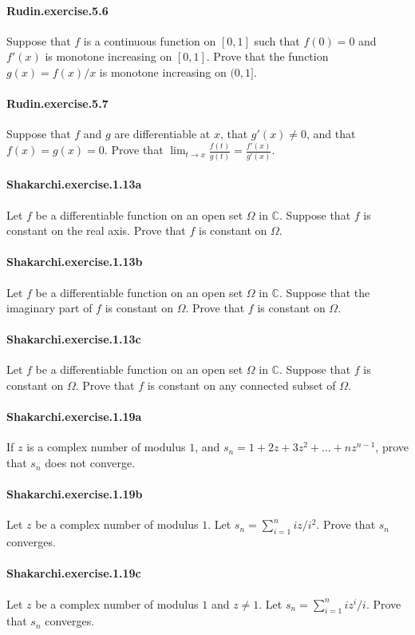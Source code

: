 \documentclass{article}
\begin{document}
\paragraph{Rudin.exercise.5.6} Suppose that $f$ is a continuous function on $[0,1]$ such that $f(0)=0$ and $f'(x)$ is monotone increasing on $[0,1]$. Prove that the function $g(x)=f(x)/x$ is monotone increasing on $(0,1]$.

\paragraph{Rudin.exercise.5.7} Suppose that $f$ and $g$ are differentiable at $x$, that $g'(x)\neq 0$, and that $f(x)=g(x)=0$. Prove that $\lim_{t\to x}\frac{f(t)}{g(t)}=\frac{f'(x)}{g'(x)}$.

\paragraph{Shakarchi.exercise.1.13a} Let $f$ be a differentiable function on an open set $\Omega$ in $\mathbb{C}$. Suppose that $f$ is constant on the real axis. Prove that $f$ is constant on $\Omega$.

\paragraph{Shakarchi.exercise.1.13b} Let $f$ be a differentiable function on an open set $\Omega$ in $\mathbb{C}$. Suppose that the imaginary part of $f$ is constant on $\Omega$. Prove that $f$ is constant on $\Omega$.

\paragraph{Shakarchi.exercise.1.13c} Let $f$ be a differentiable function on an open set $\Omega$ in $\mathbb{C}$. Suppose that $f$ is constant on $\Omega$. Prove that $f$ is constant on any connected subset of $\Omega$.

\paragraph{Shakarchi.exercise.1.19a} If $z$ is a complex number of modulus $1$, and $s_n = 1 + 2z + 3z^2 + \dots + nz^{n-1}$, prove that $s_n$ does not converge.

\paragraph{Shakarchi.exercise.1.19b} Let $z$ be a complex number of modulus $1$. Let $s_n = \sum_{i=1}^n i z/i^2$. Prove that $s_n$ converges.

\paragraph{Shakarchi.exercise.1.19c} Let $z$ be a complex number of modulus $1$ and $z\neq 1$. Let $s_n = \sum_{i=1}^n i z^i/i$. Prove that $s_n$ converges.
\end{document}
